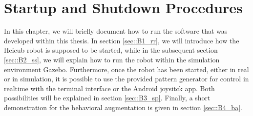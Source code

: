 \chapter{Startup and Shutdown Procedures}
\label{sec::B_su}
In this chapter, we will briefly document how to run the software that was developed within this thesis. In section \ref{sec::B1_rr}, we will introduce how the Heicub robot is supposed to be started, while in the subsequent section \ref{sec::B2_ss}, we will explain how to run the robot within the simulation environment Gazebo. Furthermore, once the robot has been started, either in real or in simulation, it is possible to use the provided pattern generator for control in realtime with the terminal interface or the Android joysitck app. Both possibilities will be explained in section \ref{sec::B3_sp}. Finally, a short demonstration for the behavioral augmentation is given in section \ref{sec::B4_ba}.
\FloatBarrier
